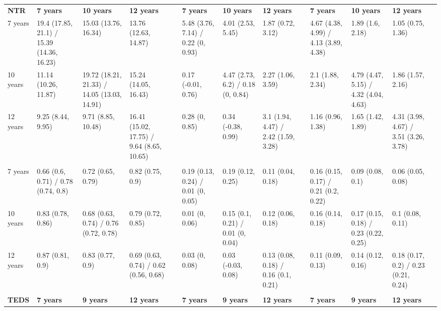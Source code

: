 \begin{tabular}{llllrlllrlllr}
  \cmidrule{2-4}\cmidrule{6-8}\cmidrule{10-12}    \textbf{NTR} & \textbf{7 years} & \textbf{10 years} & \textbf{12 years} &       & \textbf{7 years} & \textbf{10 years} & \textbf{12 years} &       & \textbf{7 years} & \textbf{10 years} & \textbf{12 years} &  \\
  \cmidrule{1-12}    7 years & 19.4 (17.85, 21.1) / 15.39 (14.36, 16.23) & 15.03 (13.76, 16.34) & 13.76 (12.63, 14.87) &       & 5.48 (3.76, 7.14) / 0.22 (0, 0.93) & 4.01 (2.53, 5.45) & 1.87 (0.72, 3.12) &       & 4.67 (4.38, 4.99) / 4.13 (3.89, 4.38) & 1.89 (1.6, 2.18) & 1.05 (0.75, 1.36) &  \\
  10 years & 11.14 (10.26, 11.87) & 19.72 (18.21, 21.33) / 14.05 (13.03, 14.91) & 15.24 (14.05, 16.43) &       & 0.17 (-0.01, 0.76) & 4.47 (2.73, 6.2) / 0.18 (0, 0.84) & 2.27 (1.06, 3.59) &       & 2.1 (1.88, 2.34) & 4.79 (4.47, 5.15) / 4.32 (4.04, 4.63) & 1.86 (1.57, 2.16) &  \\
  12 years & 9.25 (8.44, 9.95) & 9.71 (8.85, 10.48) & 16.41 (15.02, 17.75) / 9.64 (8.65, 10.65) &       & 0.28 (0, 0.85) & 0.34 (-0.38, 0.99) & 3.1 (1.94, 4.47) / 2.42 (1.59, 3.28) &       & 1.16 (0.96, 1.38) & 1.65 (1.42, 1.89) & 4.31 (3.98, 4.67) / 3.51 (3.26, 3.78) &  \\
  & \multicolumn{3}{r}{}  &       & \multicolumn{3}{c}{}  &       & \multicolumn{3}{c}{}  &  \\
  7 years & 0.66 (0.6, 0.71) / 0.78 (0.74, 0.8) & 0.72 (0.65, 0.79) & 0.82 (0.75, 0.9) &       & 0.19 (0.13, 0.24) / 0.01 (0, 0.05) & 0.19 (0.12, 0.25) & 0.11 (0.04, 0.18) &       & 0.16 (0.15, 0.17) / 0.21 (0.2, 0.22) & 0.09 (0.08, 0.1) & 0.06 (0.05, 0.08) &  \\
  10 years & 0.83 (0.78, 0.86) & 0.68 (0.63, 0.74) / 0.76 (0.72, 0.78) & 0.79 (0.72, 0.85) &       & 0.01 (0, 0.06) & 0.15 (0.1, 0.21) / 0.01 (0, 0.04) & 0.12 (0.06, 0.18) &       & 0.16 (0.14, 0.18) & 0.17 (0.15, 0.18) / 0.23 (0.22, 0.25) & 0.1 (0.08, 0.11) &  \\
  12 years & 0.87 (0.81, 0.9) & 0.83 (0.77, 0.9) & 0.69 (0.63, 0.74) / 0.62 (0.56, 0.68) &       & 0.03 (0, 0.08) & 0.03 (-0.03, 0.08) & 0.13 (0.08, 0.18) / 0.16 (0.1, 0.21) &       & 0.11 (0.09, 0.13) & 0.14 (0.12, 0.16) & 0.18 (0.17, 0.2) / 0.23 (0.21, 0.24) &  \\
  & \multicolumn{3}{c}{}  &       & \multicolumn{3}{c}{}  &       & \multicolumn{3}{c}{}  &  \\
  \cmidrule{2-4}\cmidrule{6-8}\cmidrule{10-12}    \textbf{TEDS} & \textbf{7 years} & \textbf{9 years} & \textbf{12 years} &       & \textbf{7 years} & \textbf{9 years} & \textbf{12 years} &       & \textbf{7 years} & \textbf{9 years} & \textbf{12 years} &  \\

\end{tabular}
